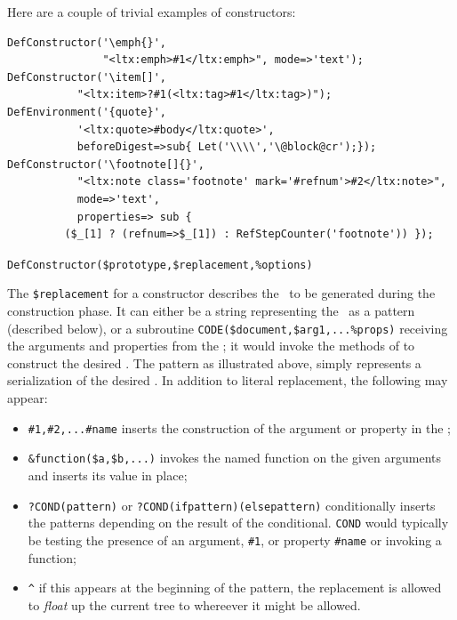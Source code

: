 \documentclass{book}
\begin{document}
Here are a couple of trivial examples of constructors:
\begin{verbatim}
DefConstructor('\emph{}',
               "<ltx:emph>#1</ltx:emph>", mode=>'text');
DefConstructor('\item[]',
	       "<ltx:item>?#1(<ltx:tag>#1</ltx:tag>)");
DefEnvironment('{quote}',   
	       '<ltx:quote>#body</ltx:quote>',
	       beforeDigest=>sub{ Let('\\\\','\@block@cr');});
DefConstructor('\footnote[]{}',
	       "<ltx:note class='footnote' mark='#refnum'>#2</ltx:note>",
	       mode=>'text',
	       properties=> sub { 
		 ($_[1] ? (refnum=>$_[1]) : RefStepCounter('footnote')) });
\end{verbatim}

\par\noindent\verb|DefConstructor($prototype,$replacement,%options)|
\par
The  \verb|$replacement| for a constructor describes the \XML\ to
be generated during the construction phase. It can either be a string
representing the \XML\ as a pattern (described below), or a
subroutine \verb|CODE($document,$arg1,...%props)|
receiving the arguments and properties from the ;
it would invoke the methods of  to construct the desired \XML.
The pattern as illustrated above, simply represents a serialization of the
desired \XML.  In addition to literal replacement, the following may appear:
\begin{itemize}
\item \verb|#1,#2,...#name| inserts the construction of the argument
or property in the \XML;
\item \verb|&function($a,$b,...)| invokes the named function on the
given arguments and inserts its value in place;
\item \verb|?COND(pattern)| or \verb|?COND(ifpattern)(elsepattern)|
conditionally inserts the patterns depending on the result of the conditional.
\texttt{COND} would typically be testing the presence of an argument, \verb|#1|,
or property \verb|#name| or invoking a function;
\item \verb|^| if this appears at the beginning of the pattern,
the replacement is allowed to \emph{float} up the current tree to whereever
it might be allowed.
\end{itemize}
\end{document}
